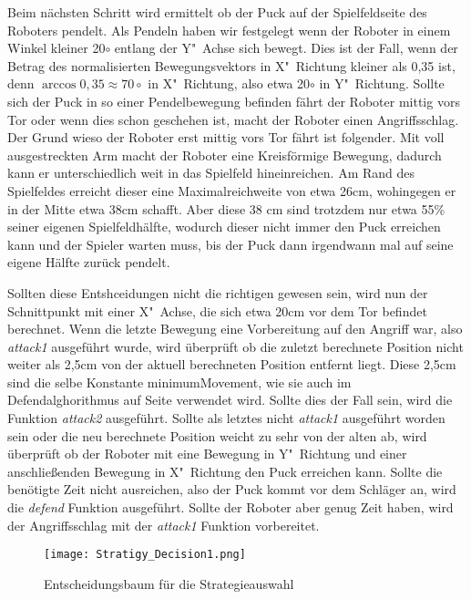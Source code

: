 Beim nächsten Schritt wird ermittelt ob der Puck auf der Spielfeldseite des Roboters pendelt. Als Pendeln haben wir festgelegt wenn der Roboter in einem Winkel kleiner 20$\circ$ entlang der Y"~Achse sich bewegt. Dies ist der Fall, wenn der Betrag des normalisierten Bewegungsvektors in X"~Richtung kleiner als 0,35 ist, denn $\arccos 0,35 \approx 70\circ$ in X"~Richtung, also etwa 20$\circ$ in Y"~Richtung. Sollte sich der Puck in so einer Pendelbewegung befinden fährt der Roboter mittig vors Tor oder wenn dies schon geschehen ist, macht der Roboter einen Angriffsschlag. Der Grund wieso der Roboter erst mittig vors Tor fährt ist folgender. Mit voll ausgestreckten Arm macht der Roboter eine Kreisförmige Bewegung, dadurch kann er unterschiedlich weit in das Spielfeld hineinreichen. Am Rand des Spielfeldes erreicht dieser eine Maximalreichweite von etwa 26cm, wohingegen er in der Mitte etwa 38cm schafft. Aber diese 38 cm sind trotzdem nur etwa 55\% seiner eigenen Spielfeldhälfte, wodurch dieser nicht immer den Puck erreichen kann und der Spieler warten muss, bis der Puck dann irgendwann mal auf seine eigene Hälfte zurück pendelt.

Sollten diese Entshceidungen nicht die richtigen gewesen sein, wird nun der Schnittpunkt mit einer X"~Achse, die sich etwa 20cm vor dem Tor befindet berechnet. Wenn die letzte Bewegung eine Vorbereitung auf den Angriff war, also \textit{attack1} ausgeführt wurde, wird überprüft ob die zuletzt berechnete Position nicht weiter als 2,5cm von der aktuell berechneten Position entfernt liegt. Diese 2,5cm sind die selbe Konstante minimumMovement, wie sie auch im Defendalghorithmus auf Seite \pageref{lst:defensivstrategie} verwendet wird. Sollte dies der Fall sein, wird die Funktion \textit{attack2} ausgeführt. Sollte als letztes nicht \textit{attack1} ausgeführt worden sein oder die neu berechnete Position weicht zu sehr von der alten ab, wird überprüft ob der Roboter mit eine Bewegung in Y"~Richtung und einer anschließenden Bewegung in X"~Richtung den Puck erreichen kann. Sollte die benötigte Zeit nicht ausreichen, also der Puck kommt vor dem Schläger an, wird die \textit{defend} Funktion ausgeführt. Sollte der Roboter aber genug Zeit haben, wird der Angriffsschlag mit der \textit{attack1} Funktion vorbereitet.

\begin{figure}[htbp]
	\texttt{[image: Stratigy\_Decision1.png]}
	\caption{Entscheidungsbaum für die Strategieauswahl}
	\label{img:Entscheidungsbaum Strategieauswahl}
\end{figure}